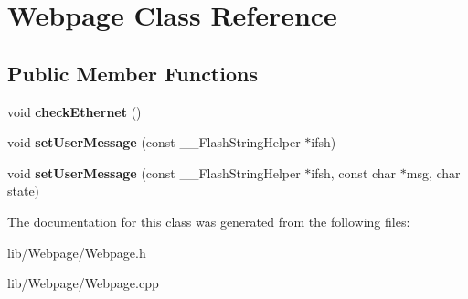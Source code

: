 \hypertarget{class_webpage}{}\section{Webpage Class Reference}
\label{class_webpage}
\subsection*{Public Member Functions}
\begin{DoxyCompactItemize}
\item 
\mbox{\label{class_webpage_a837ae9ec501b0aaeb7d8438f94260bd3}} 
void {\bfseries check\+Ethernet} ()
\item 
\mbox{\label{class_webpage_ad41ea04a2aa154eb74ca41aa8c725723}} 
void {\bfseries set\+User\+Message} (const \+\_\+\+\_\+\+Flash\+String\+Helper $\ast$ifsh)
\item 
\mbox{\label{class_webpage_a5db8aeec5af0efa37f1c6206039af189}} 
void {\bfseries set\+User\+Message} (const \+\_\+\+\_\+\+Flash\+String\+Helper $\ast$ifsh, const char $\ast$msg, char state)
\end{DoxyCompactItemize}


The documentation for this class was generated from the following files\+:\begin{DoxyCompactItemize}
\item 
lib/\+Webpage/Webpage.\+h\item 
lib/\+Webpage/Webpage.\+cpp\end{DoxyCompactItemize}
